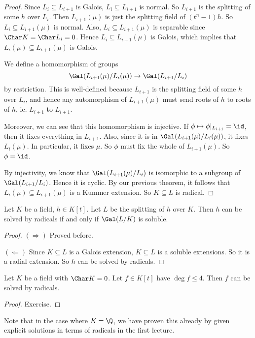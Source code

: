 \documentclass[a4paper]{article}
\begin{document}
\begin{proof}
  Since $L_i \subseteq L_{i + 1}$ is Galois, $L_i \subseteq L_{i + 1}$ is normal. So $L_{i + 1}$ is the splitting of some $h$ over $L_i$. Then $L_{i + 1}(\mu)$ is just the splitting field of $(t^n - 1) h$. So $L_i \subseteq L_{i + 1}(\mu)$ is normal. Also, $L_i \subseteq L_{i + 1}(\mu)$ is separable since $\Char K = \Char L_i = 0$. Hence $L_i \subseteq L_{i + 1}(\mu)$ is Galois, which implies that $L_i(\mu) \subseteq L_{i + 1}(\mu)$ is Galois.

  We define a homomorphism of groups
  \[
    \Gal(L_{i + 1}(\mu) / L_i (\mu)) \to \Gal(L_{i + 1}/L_i)
  \]
  by restriction. This is well-defined because $L_{i + 1}$ is the splitting field of some $h$ over $L_i$, and hence any automorphism of $L_{i + 1}(\mu)$ must send roots of $h$ to roots of $h$, ie. $L_{i + 1}$ to $L_{i + 1}$.

  Moreover, we can see that this homomorphism is injective. If $\phi \mapsto \phi|_{L_{i + 1}} = \id$, then it fixes everything in $L_{i + 1}$. Also, since it is in $\Gal(L_{i + 1}(\mu)/L_i(\mu))$, it fixes $L_i(\mu)$. In particular, it fixes $\mu$. So $\phi$ must fix the whole of $L_{i + 1}(\mu)$. So $\phi = \id$.

  By injectivity, we know that $\Gal(L_{i + 1}(\mu)/L_i)$ is isomorphic to a subgroup of $\Gal(L_{i + 1}/L_i)$. Hence it is cyclic. By our previous theorem, it follows that $L_i(\mu) \subseteq L_{i + 1}(\mu)$ is a Kummer extension. So $K\subseteq L$ is radical.
\end{proof}

\begin{cor}
  Let $K$ be a field, $h \in K[t]$. Let $L$ be the splitting of $h$ over $K$. Then $h$ can be solved by radicals if and only if $\Gal(L/K)$ is soluble.
\end{cor}

\begin{proof}
  $(\Rightarrow)$ Proved before.

  $(\Leftarrow)$ Since $K\subseteq L$ is a Galois extension, $K\subseteq L$ is a soluble extensions. So it is a radial extension. So $h$ can be solved by radicals.
\end{proof}

\begin{cor}
  Let $K$ be a field with $\Char K = 0$. Let $f \in K[t]$ have $\deg f \leq 4$. Then $f$ can be solved by radicals.
\end{cor}

\begin{proof}
  Exercise.
\end{proof}

Note that in the case where $K = \Q$, we have proven this already by given explicit solutions in terms of radicals in the first lecture.
\end{document}
